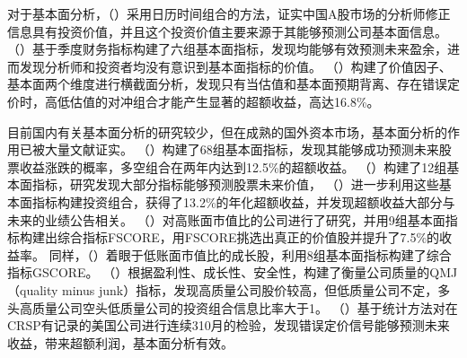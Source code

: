 对于基本面分析，\citeauthor{zhangFenXiShiXiuZhengXinXiJiBenMianFenXiYuWeiLaiGuPiaoShouYi2017}（\citeyear{zhangFenXiShiXiuZhengXinXiJiBenMianFenXiYuWeiLaiGuPiaoShouYi2017}）采用日历时间组合的方法，证实中国A股市场的分析师修正信息具有投资价值，并且这个投资价值主要来源于其能够预测公司基本面信息。
\citeauthor{wangJiBenMianFenXiZaiZhongGuoAGuShiChangYouYongMaLaiZiJiDuCaiWuBaoBiaoDeZhengJu2018}（\citeyear{wangJiBenMianFenXiZaiZhongGuoAGuShiChangYouYongMaLaiZiJiDuCaiWuBaoBiaoDeZhengJu2018}）基于季度财务指标构建了六组基本面指标，发现均能够有效预测未来盈余，进而发现分析师和投资者均没有意识到基本面指标的价值。
\citeauthor{changJieZhiYinZiBeiHouDeLuoJiGuZhiJiBenMianYuQiChaiYuCuoWuDingJie2020}（\citeyear{changJieZhiYinZiBeiHouDeLuoJiGuZhiJiBenMianYuQiChaiYuCuoWuDingJie2020}）构建了价值因子、基本面两个维度进行横截面分析，发现只有当估值和基本面预期背离、存在错误定价时，高低估值的对冲组合才能产生显著的超额收益，高达16.8\%。

目前国内有关基本面分析的研究较少，但在成熟的国外资本市场，基本面分析的作用已被大量文献证实。
\citeauthor{ouInancialStatementAnalys1988}（\citeyear{ouInancialStatementAnalys1988}）构建了68组基本面指标，发现其能够成功预测未来股票收益涨跌的概率，多空组合在两年内达到12.5\%的超额收益。
\citeauthor{abarbanellFundamentalAnalysisFuture21}（\citeyear{abarbanellFundamentalAnalysisFuture21}）构建了12组基本面指标，研究发现大部分指标能够预测股票未来价值，
\citeauthor{abarbanellAbnormalReturnsFundamental1998}（\citeyear{abarbanellAbnormalReturnsFundamental1998}）进一步利用这些基本面指标构建投资组合，获得了13.2\%的年化超额收益，并发现超额收益大部分与未来的业绩公告相关。
\citeauthor{piotroskiValueInvestingUse2000}（\citeyear{piotroskiValueInvestingUse2000}）对高账面市值比的公司进行了研究，并用9组基本面指标构建出综合指标FSCORE，用FSCORE挑选出真正的价值股并提升了7.5\%的收益率。
同样，\citeauthor{mohanramSeparatingWinnersLosers}（\citeyear{mohanramSeparatingWinnersLosers}）着眼于低账面市值比的成长股，利用8组基本面指标构建了综合指标GSCORE。
\citeauthor{asnessQualityMinusJunk2019}（\citeyear{asnessQualityMinusJunk2019}）根据盈利性、成长性、安全性，构建了衡量公司质量的QMJ（quality minus junk）指标，发现高质量公司股价较高，但低质量公司不定，多头高质量公司空头低质量公司的投资组合信息比率大于1。
\citeauthor{bartramAgnosticFundamentalAnalysis2018a}（\citeyear{bartramAgnosticFundamentalAnalysis2018a}）基于统计方法对在CRSP有记录的美国公司进行连续310月的检验，发现错误定价信号能够预测未来收益，带来超额利润，基本面分析有效。

